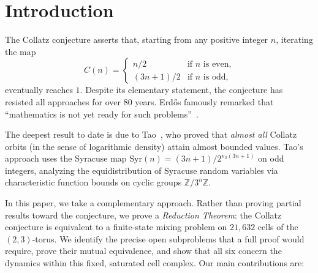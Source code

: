 \documentclass{CUP-JNL-FMP}%
\theoremstyle{definition}
\numberwithin{equation}{section}
\newcommand{\ZZ}{\mathbb{Z}}
\newcommand{\Syr}{\mathrm{Syr}}
\newcommand{\val}{\mathrm{v}_2}
\begin{document}
\localtableofcontents

\section{Introduction}

The Collatz conjecture asserts that, starting from any positive integer $n$,
iterating the map
\begin{equation}\label{eq:collatz}
  C(n) = \begin{cases} n/2 & \text{if $n$ is even,} \\ (3n+1)/2 & \text{if $n$ is odd,} \end{cases}
\end{equation}
eventually reaches $1$. Despite its elementary statement, the conjecture has
resisted all approaches for over $80$ years. Erd\H{o}s famously remarked that
``mathematics is not yet ready for such problems''~\cite{Lagarias2010}.

The deepest result to date is due to Tao~\cite{Tao2022}, who proved that
\emph{almost all} Collatz orbits (in the sense of logarithmic density) attain
almost bounded values. Tao's approach uses the Syracuse map
$\Syr(n) = (3n+1)/2^{\val(3n+1)}$ on odd integers, analyzing the equidistribution
of Syracuse random variables via characteristic function bounds on cyclic groups
$\ZZ/3^n\ZZ$.

In this paper, we take a complementary approach. Rather than proving partial
results toward the conjecture, we prove a \emph{Reduction Theorem}: the Collatz
conjecture is equivalent to a finite-state mixing problem on $21{,}632$ cells
of the $(2,3)$-torus. We identify the precise open subproblems that a full proof
would require, prove their mutual equivalence, and show that all six concern the
dynamics within this fixed, saturated cell complex. Our main contributions are:
\end{document}
